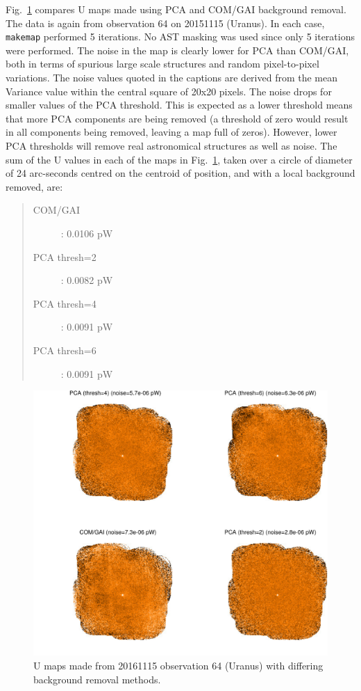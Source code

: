 \documentclass[twoside,11pt]{starlink}
\begin{document}
Fig.~\ref{fig:pca2} compares U maps made using PCA and COM/GAI background
removal. The data is again from observation 64 on 20151115 (Uranus). In
each case, \texttt{makemap} performed 5 iterations. No AST masking was
used since only 5 iterations were performed. The noise in the map is
clearly lower for PCA than COM/GAI, both in terms of spurious large scale
structures and random pixel-to-pixel variations. The noise values quoted
in the captions are derived from the mean Variance value within the
central square of 20x20 pixels. The noise drops for smaller values of the
PCA threshold. This is expected as a lower threshold means that more PCA
components are being removed (a threshold of zero would result in all
components being removed, leaving a map full of zeros). However, lower
PCA thresholds will remove real astronomical structures as well as noise.
The sum of the U values in each of the maps in Fig.~\ref{fig:pca2}, taken
over a circle of diameter of 24 arc-seconds centred on the centroid of
position, and with a local background removed, are:

\begin{quote}
\begin{description}
\item[COM/GAI]: 0.0106 pW
\item[PCA thresh=2]: 0.0082 pW
\item[PCA thresh=4]: 0.0091 pW
\item[PCA thresh=6]: 0.0091 pW
\end{description}
\end{quote}

\begin{figure}
\includegraphics[width=\columnwidth]{pca2}
\caption{U maps made from 20161115 observation 64 (Uranus)
with differing background removal methods.}
\label{fig:pca2}
\end{figure}
\end{document}
